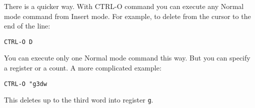 There is a quicker way.
With CTRL-O {command} you can execute any Normal mode command from Insert mode.
For example, to delete from the cursor to the end of the line:

\begin{Verbatim}[samepage=true]
 CTRL-O D
\end{Verbatim}

You can execute only one Normal mode command this way.
But you can specify a register or a count.
A more complicated example:

\begin{Verbatim}[samepage=true]
 CTRL-O "g3dw
\end{Verbatim}

This deletes up to the third word into register \verb!g!.
\clearpage
